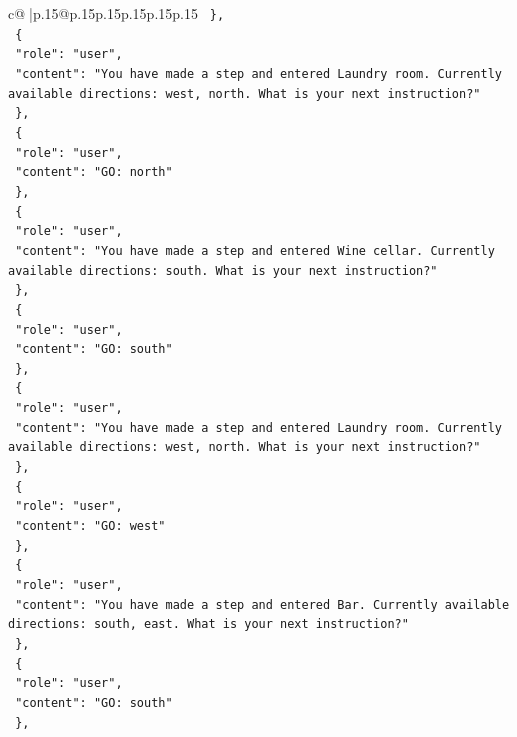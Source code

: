 \documentclass{article}
\begin{document}
{\begin{supertabular}{c@{$\;$}|p{.15\linewidth}@{}p{.15\linewidth}p{.15\linewidth}p{.15\linewidth}p{.15\linewidth}p{.15\linewidth}}
{{{\texttt{  \},} \\
\texttt{  \{} \\
\texttt{    "role": "user",} \\
\texttt{    "content": "You have made a step and entered Laundry room. Currently available directions: west, north. What is your next instruction?"} \\
\texttt{  \},} \\
\texttt{  \{} \\
\texttt{    "role": "user",} \\
\texttt{    "content": "GO: north"} \\
\texttt{  \},} \\
\texttt{  \{} \\
\texttt{    "role": "user",} \\
\texttt{    "content": "You have made a step and entered Wine cellar. Currently available directions: south. What is your next instruction?"} \\
\texttt{  \},} \\
\texttt{  \{} \\
\texttt{    "role": "user",} \\
\texttt{    "content": "GO: south"} \\
\texttt{  \},} \\
\texttt{  \{} \\
\texttt{    "role": "user",} \\
\texttt{    "content": "You have made a step and entered Laundry room. Currently available directions: west, north. What is your next instruction?"} \\
\texttt{  \},} \\
\texttt{  \{} \\
\texttt{    "role": "user",} \\
\texttt{    "content": "GO: west"} \\
\texttt{  \},} \\
\texttt{  \{} \\
\texttt{    "role": "user",} \\
\texttt{    "content": "You have made a step and entered Bar. Currently available directions: south, east. What is your next instruction?"} \\
\texttt{  \},} \\
\texttt{  \{} \\
\texttt{    "role": "user",} \\
\texttt{    "content": "GO: south"} \\
\texttt{  \},} \\
}}}
\end{supertabular}}
\end{document}
